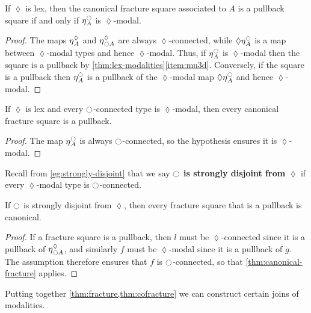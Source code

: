 \begin{thm}\label{thm:fracture}
  If $\lozenge$ is lex, then the canonical fracture square associated to $A$ is a pullback square if and only if ${\eta_{}}^{\ocircle}_A$ is $\lozenge$-modal.
\end{thm}
\begin{proof}
  The maps ${\eta_{}}^\lozenge_A$ and ${\eta_{}}^\lozenge_{{\ocircle} A}$ are always $\lozenge$-connected, while $\lozenge {\eta_{}}^{\ocircle}_A$ is a map between $\lozenge$-modal types and hence $\lozenge$-modal.
  Thus, if ${\eta_{}}^{\ocircle}_A$ is $\lozenge$-modal then the square is a pullback by \cref{thm:lex-modalities}\ref{item:mu3d}.
  Conversely, if the square is a pullback then ${\eta_{}}^{\ocircle}_A$ is a pullback of the $\lozenge$-modal map $\lozenge {\eta_{}}^{\ocircle}_A$ and hence $\lozenge$-modal.
\end{proof}

\begin{cor}
  If $\lozenge$ is lex and every ${\ocircle}$-connected type is $\lozenge$-modal, then every canonical fracture square is a pullback.
\end{cor}
\begin{proof}
  The map ${\eta_{}}^{\ocircle}_A$ is always ${\ocircle}$-connected, so the hypothesis ensures it is $\lozenge$-modal.
\end{proof}

Recall from \cref{eg:strongly-disjoint} that we say \textbf{${\ocircle}$ is strongly disjoint from $\lozenge$} if every $\lozenge$-modal type is ${\ocircle}$-connected.

\begin{thm}\label{thm:cofracture}
  If ${\ocircle}$ is strongly disjoint from $\lozenge$, then every fracture square that is a pullback is canonical.
\end{thm}
\begin{proof}
  If a fracture square is a pullback, then $l$ must be $\lozenge$-connected since it is a pullback of ${\eta_{}}^\lozenge_{{\ocircle} A}$, and similarly $f$ must be $\lozenge$-modal since it is a pullback of $g$.
  The assumption therefore ensures that $f$ is ${\ocircle}$-connected, so that \cref{thm:canonical-fracture} applies.
\end{proof}

Putting together \cref{thm:fracture,thm:cofracture} we can construct certain joins of modalities.

